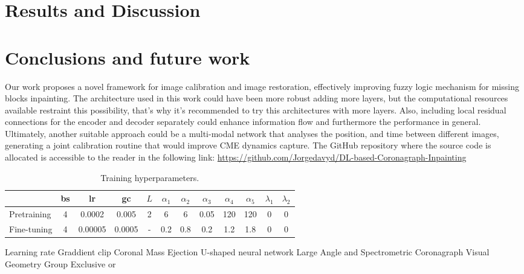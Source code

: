 \documentclass[draft]{agujournal2019}
\begin{document}
\section{Results and Discussion}

\section{Conclusions and future work}
Our work proposes a novel framework for image calibration and image restoration, effectively improving fuzzy logic mechanism for missing blocks inpainting. The architecture used in this work could have been more robust adding more layers, but the computational resources available restraint this possibility, that's why it's recommended to try this architectures with more layers. Also, including local residual connections for the encoder and decoder separately could enhance information flow and furthermore the performance in general. Ultimately, another suitable approach could be a multi-modal network that analyses the position, and time between different images, generating a joint calibration routine that would improve CME dynamics capture. The GitHub repository where the source code is allocated is accessible to the reader in the following link: \url{https://github.com/Jorgedavyd/DL-based-Coronagraph-Inpainting}

\begin{table}
 \caption{Training hyperparameters.}
 \label{tab: example}
 \centering
 \begin{tabular}{l c c c c c c c c c c c}
 \hline
    & bs& lr & gc & $L$ & $\alpha_1$ & $\alpha_2$ & $\alpha_3$ & $\alpha_4$ & $\alpha_5$ & $\lambda_1$ & $\lambda_2$  \\
 \hline
   Pretraining  & 4 & 0.0002 & 0.005 & 2 & 6 & 6 & 0.05 & 120 & 120 & 0 & 0 \\
   Fine-tuning  & 4 & 0.00005 & 0.0005 & - & 0.2 & 0.8 & 0.2 & 1.2 & 1.8 & 0 & 0   \\
 \hline
 \end{tabular}
 \end{table}
\begin{acronyms}
Learning rate
Graddient clip
Coronal Mass Ejection
U-shaped neural network
Large Angle and Spectrometric Coronagraph
Visual Geometry Group
Exclusive or
\end{acronyms}
\end{document}
